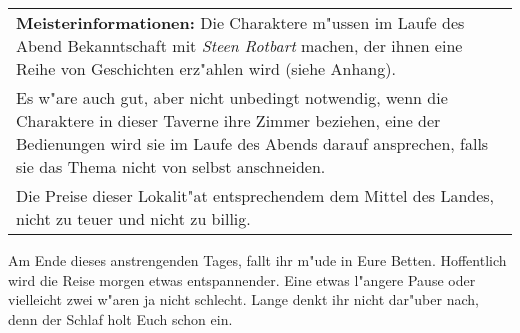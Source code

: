\begin{longtable}{|p{15cm}|}
\hline
\textbf{Meisterinformationen:}
Die Charaktere m"ussen im Laufe des Abend Bekanntschaft mit \textit{Steen Rotbart} machen, der ihnen eine Reihe von Geschichten erz"ahlen wird (siehe Anhang).\\
Es w"are auch gut, aber nicht unbedingt notwendig, wenn die Charaktere in dieser Taverne ihre Zimmer beziehen, eine der Bedienungen wird sie im Laufe des Abends darauf ansprechen, falls sie das Thema nicht von selbst anschneiden.\\
Die Preise dieser Lokalit"at entsprechendem dem Mittel des Landes, nicht zu teuer und nicht zu billig.\\
\hline
\end{longtable}

\par Am Ende dieses anstrengenden Tages, fallt ihr m"ude in Eure Betten. Hoffentlich wird die Reise morgen etwas entspannender. Eine etwas l"angere Pause oder vielleicht zwei w"aren ja nicht schlecht. Lange denkt ihr nicht dar"uber nach, denn der Schlaf holt Euch schon ein.
